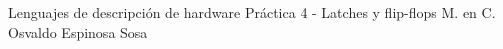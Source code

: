 




	\pnormal
	{Lenguajes de descripción de hardware}
	{Práctica 4  - Latches y flip-flops}
	{M. en C. Osvaldo Espinosa Sosa}
	\tableofcontents
	
	\newpage    
	\clearpage  
	\clearpage 




